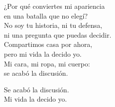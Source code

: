 \begin{lyrics}
¿Por qué conviertes mi apariencia\\
en una batalla que no elegí?\\
No soy tu historia, ni tu defensa,\\
ni una pregunta que puedas decidir.\\
Compartimos casa por ahora,\\
pero mi vida la decido yo.\\
Mi cara, mi ropa, mi cuerpo:\\
se acabó la discusión.

Se acabó la discusión.\\
Mi vida la decido yo.
\end{lyrics}

